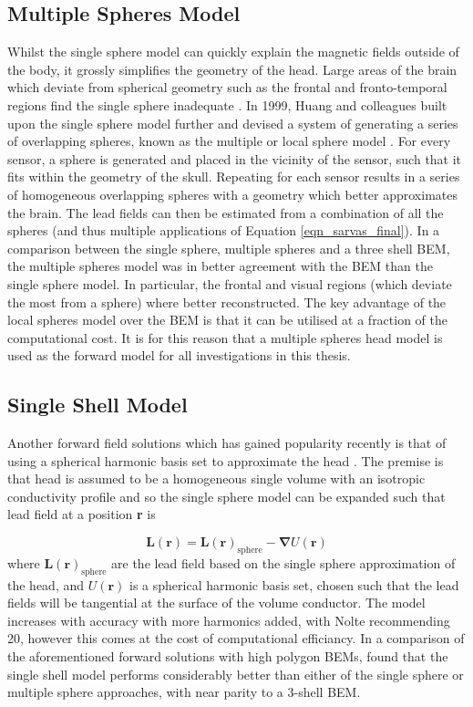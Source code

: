 \subsection{Multiple Spheres Model}
Whilst the single sphere model can quickly explain the magnetic fields outside of the body, it grossly simplifies the geometry of the head. Large areas of the brain which deviate from spherical geometry such as the frontal and fronto-temporal regions find the single sphere inadequate \citep{Hamalainen1989}. In 1999, Huang and colleagues built upon the single sphere model further and devised a system of generating a series of overlapping spheres, known as the multiple or local sphere model \citep{Huang1999}. For every sensor, a sphere is generated and placed in the vicinity of the sensor, such that it fits within the geometry of the skull. Repeating for each sensor results in a series of homogeneous overlapping spheres with a geometry which better approximates the brain. The lead fields can then be estimated from a combination of all the spheres (and thus multiple applications of Equation \ref{eqn_sarvas_final}). In a comparison between the single sphere, multiple spheres and a three shell BEM, the multiple spheres model was in better agreement with the BEM than the single sphere model. In particular, the frontal and visual regions (which deviate the most from a sphere) where better reconstructed. The key advantage of the local spheres model over the BEM is that it can be utilised at a fraction of the computational cost. It is for this reason that a multiple spheres head model is used as the forward model for all investigations in this thesis.

\subsection{Single Shell Model}
Another forward field solutions which has gained popularity recently is that of using a spherical harmonic basis set to approximate the head \citep{Nolte2003}. The premise is that head is assumed to be a homogeneous single volume with an isotropic conductivity profile and so the single sphere model can be expanded such that lead field at a position \textbf{r} is

\begin{equation}
\mathbf{L}(\mathbf{r}) = \mathbf{L}(\mathbf{r})_\text{sphere} - \mathbf{\nabla}U(\mathbf{r})
\end{equation} where $\mathbf{L}(\mathbf{r})_\text{sphere}$ are the lead field based on the single sphere approximation of the head, and $U(\mathbf{r})$ is a spherical harmonic basis set, chosen such that the lead fields will be tangential at the surface of the volume conductor. The model increases with accuracy with more harmonics added, with Nolte recommending 20, however this comes at the cost of computational efficiancy. In a comparison of the aforementioned forward solutions with high polygon BEMs, \cite{Stenroos2014} found that the single shell model performs considerably better than either of the single sphere or multiple sphere approaches, with near parity to a 3-shell BEM. 


